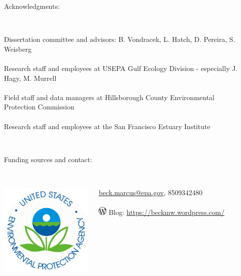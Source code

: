 \documentclass[serif]{beamer}\usepackage[]{graphicx}\usepackage[]{color}
\begin{document}
\begin{frame}
Acknowledgments:\\~\\
\begin{columns}
\begin{column}{0.8\textwidth}
{\footnotesize
Dissertation committee and advisors: B. Vondracek, L. Hatch, D. Pereira, S. Weisberg \\~\\
Research staff and employees at USEPA Gulf Ecology Division - especially J. Hagy, M. Murrell\\~\\
Field staff and data managers at Hillsborough County Environmental Protection Commission\\~\\
Research staff and employees at the San Francisco Estuary Institute}\\~\\
\end{column}
\begin{column}{0.2\textwidth}
\end{column}
\end{columns}
\vfill
Funding sources and contact:\\~\\
\begin{columns}
\begin{column}{0.4\textwidth}
\centerline{\includegraphics[width=0.4\linewidth]{fig/epa_logo.png}}
\end{column}
\begin{column}{0.6\textwidth}
\scriptsize
\href{mailto:beck.marcus@epa.gov}{beck.marcus@epa.gov}, 8509342480 \\~\\
\includegraphics[width = 0.05\textwidth]{fig/wordpress.png} Blog: \href{https://beckmw.wordpress.com/}{https://beckmw.wordpress.com/} \\~\\

\end{column}
\end{columns}
\end{frame}
\end{document}
